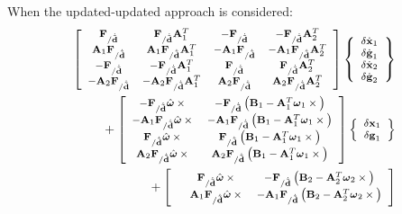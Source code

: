 \documentclass[10pt,dvips,fleqn,subeqn]{report}
\newcommand{\T}[1]{\bm{\mathbf{#1}}}
\newcommand{\TT}[1]{\bm{\mathbf{#1}}}
\begin{document}
When the updated-updated approach is considered:
\begin{align}
	\footnotesize
	\sqbr{\matr{cccc}{
		\T{F}_{/\dot{\tilde{\T{d}}}} 
		& \T{F}_{/\dot{\tilde{\T{d}}}} \TT{A}_1^T
		& - \T{F}_{/\dot{\tilde{\T{d}}}}
		& - \T{F}_{/\dot{\tilde{\T{d}}}} \TT{A}_2^T \\
%
		\TT{A}_1 \T{F}_{/\dot{\tilde{\T{d}}}} 
		& \TT{A}_1 \T{F}_{/\dot{\tilde{\T{d}}}} \TT{A}_1^T
		& - \TT{A}_1 \T{F}_{/\dot{\tilde{\T{d}}}}
		& - \TT{A}_1 \T{F}_{/\dot{\tilde{\T{d}}}} \TT{A}_2^T \\
%
		- \T{F}_{/\dot{\tilde{\T{d}}}} 
		& - \T{F}_{/\dot{\tilde{\T{d}}}} \TT{A}_1^T
		& \T{F}_{/\dot{\tilde{\T{d}}}}
		& \T{F}_{/\dot{\tilde{\T{d}}}} \TT{A}_2^T \\
%
		- \TT{A}_2 \T{F}_{/\dot{\tilde{\T{d}}}} 
		& - \TT{A}_2 \T{F}_{/\dot{\tilde{\T{d}}}} \TT{A}_1^T
		& \TT{A}_2 \T{F}_{/\dot{\tilde{\T{d}}}}
		& \TT{A}_2 \T{F}_{/\dot{\tilde{\T{d}}}} \TT{A}_2^T
	}} \cubr{\cvvect{
		\delta\dot{\T{x}}_1 \\
		\delta\dot{\T{g}}_1 \\
		\delta\dot{\T{x}}_2 \\
		\delta\dot{\T{g}}_2
	}} & \nonumber \\
	\footnotesize
	\mbox{} + \sqbr{\matr{cccc}{
		- \T{F}_{/\dot{\tilde{\T{d}}}} \hat{\T{\omega}}\times{}
		& - \T{F}_{/\dot{\tilde{\T{d}}}} \plbr{\TT{B}_1 - \TT{A}_1^T\T{\omega}_1\times{}} \\
%
		- \TT{A}_1 \T{F}_{/\dot{\tilde{\T{d}}}} \hat{\T{\omega}}\times{}
		& - \TT{A}_1 \T{F}_{/\dot{\tilde{\T{d}}}} \plbr{\TT{B}_1 - \TT{A}_1^T\T{\omega}_1\times{}} \\
%
		\T{F}_{/\dot{\tilde{\T{d}}}} \hat{\T{\omega}}\times{}
		& \T{F}_{/\dot{\tilde{\T{d}}}} \plbr{\TT{B}_1 - \TT{A}_1^T\T{\omega}_1\times{}} \\
%
		\TT{A}_2 \T{F}_{/\dot{\tilde{\T{d}}}} \hat{\T{\omega}}\times{}
		& \TT{A}_2 \T{F}_{/\dot{\tilde{\T{d}}}} \plbr{\TT{B}_1 - \TT{A}_1^T\T{\omega}_1\times{}}
	}}\cubr{\cvvect{
		\delta\T{x}_1 \\
		\delta\T{g}_1
	}} & \nonumber \\
	\footnotesize
	\mbox{} + \sqbr{\matr{cccc}{
		& \T{F}_{/\dot{\tilde{\T{d}}}} \hat{\T{\omega}}\times{}
		& - \T{F}_{/\dot{\tilde{\T{d}}}} \plbr{\TT{B}_2 - \TT{A}_2^T\T{\omega}_2\times{}} \\
%
		& \TT{A}_1 \T{F}_{/\dot{\tilde{\T{d}}}} \hat{\T{\omega}}\times{}
		& - \TT{A}_1 \T{F}_{/\dot{\tilde{\T{d}}}} \plbr{\TT{B}_2 - \TT{A}_2^T\T{\omega}_2\times{}} \\
}}
\end{align}
\end{document}
